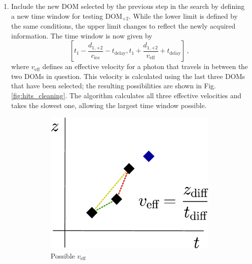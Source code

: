 \documentclass[../Main.tex]{subfiles}
\begin{document}
\begin{enumerate}
\item Include the new DOM selected by the previous step in the search by defining a new time window for testing DOM$_{+2}$. While the lower limit is defined by the same conditions, the upper limit changes to reflect the newly acquired information. The time window is now given by
  \begin{equation}
    \left[t_1 - \frac{d_\mathrm{1,+2}}{c_\mathrm{ice}} - t_\mathrm{delay}, t_1 + \frac{d_\mathrm{1,+2}}{v_\mathrm{eff}} + t_\mathrm{delay}\right]\,,
    \label{eq:time_window2}
  \end{equation}
where $v_\mathrm{eff}$ defines an effective velocity for a photon that travels in between the two DOMs in question. This velocity is calculated using the last three DOMs that have been selected; the resulting possibilities are shown in Fig.\,\ref{fig:hits_cleaning}. The algorithm calculates all three effective velocities and takes the slowest one, allowing the largest time window possible.
\begin{figure}[tbph]
  \centering
  \hspace*{\fill}
  \begin{subfigure}[b]{0.37\textwidth}
    \centering
    \includegraphics[width=\textwidth]{selection1}
    \caption{Possible $v_\mathrm{eff}$}
    \label{fig:cleaning1}
  \end{subfigure}\hfill
  \begin{subfigure}[b]{0.37\textwidth}
    \centering

\end{subfigure}
\end{figure}
\end{enumerate}
\end{document}
